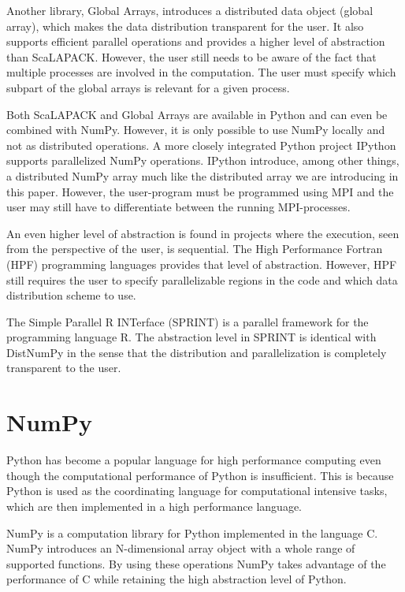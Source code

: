 \documentclass[10pt]{article}
\begin{document}
Another library, Global Arrays\cite{Nieplocha96}, introduces a distributed data object (global array), which makes the data distribution transparent for the user. It also supports efficient parallel operations and provides a higher level of abstraction than ScaLAPACK. However, the user still needs to be aware of the fact that multiple processes are involved in the computation. The user must specify which subpart of the global arrays is relevant for a given process.

Both ScaLAPACK and Global Arrays are available in Python and can even be combined with NumPy. However, it is only possible to use NumPy locally and not as distributed operations. A more closely integrated Python project IPython\cite{PER-GRA:2007} supports parallelized NumPy operations. IPython introduce, among other things, a distributed NumPy array much like the distributed array we are introducing in this paper. However, the user-program must be programmed using MPI and the user may still have to differentiate between the running MPI-processes.

An even higher level of abstraction is found in projects where the execution, seen from the perspective of the user, is sequential. The High Performance Fortran (HPF)\cite{Loveman93} programming languages provides that level of abstraction. However, HPF still requires the user to specify parallelizable regions in the code and which data distribution scheme to use. 

The Simple Parallel R INTerface (SPRINT)\cite{Hill08} is a parallel framework for the programming language R. The abstraction level in SPRINT is identical with DistNumPy in the sense that the distribution and parallelization is completely transparent to the user.

\section{NumPy}
Python has become a popular language for high performance computing even though the computational performance of Python is insufficient. This is because Python is used as the coordinating language for computational intensive tasks, which are then implemented in a high performance language.

NumPy\cite{numpy} is a computation library for Python implemented in the language C. NumPy introduces an N-dimensional array object with a whole range of supported functions. By using these operations NumPy takes advantage of the performance of C while retaining the high abstraction level of Python.
\end{document}

